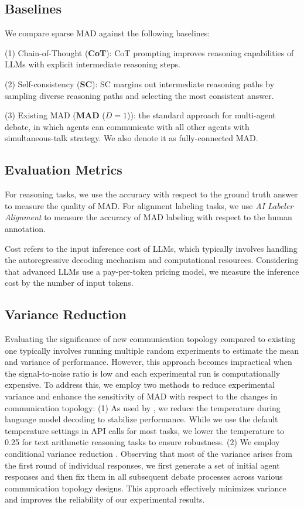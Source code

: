 \documentclass[11pt]{article}
\begin{document}
\subsection{Baselines}
We compare sparse MAD against the following baselines:

(1) \noindent Chain-of-Thought (\textbf{CoT}): CoT prompting improves reasoning capabilities of LLMs with explicit intermediate reasoning steps.

(2) \noindent Self-consistency (\textbf{SC}): SC margins out intermediate reasoning paths by sampling diverse reasoning paths and selecting the most consistent answer.

(3) \noindent Existing MAD (\textbf{MAD} ($D=1$)): the standard approach for multi-agent debate, in which agents can communicate with all other agents with simultaneous-talk strategy. We also denote it as fully-connected MAD.


\subsection{Evaluation Metrics}
For reasoning tasks, we use the accuracy with respect to the ground truth answer to measure the quality of MAD. For alignment labeling tasks, we use \textit{AI Labeler Alignment} \cite{lee2023rlaif} to measure the accuracy of MAD labeling with respect to the human annotation.

Cost refers to the input inference cost of LLMs, which typically involves handling the autoregressive decoding mechanism and computational resources. Considering that advanced LLMs use a pay-per-token pricing model, we measure the inference cost by the number of input tokens.

\subsection{Variance Reduction}
Evaluating the significance of new communication topology compared to existing one typically involves running multiple random experiments to estimate the mean and variance of performance. However, this approach becomes impractical when the signal-to-noise ratio is low and each experimental run is computationally expensive. To address this, we employ two methods to reduce experimental variance and enhance the sensitivity of MAD with respect to the changes in communication topology: (1) As used by \citet{wang2024rethinking}, we reduce the temperature during language model decoding to stabilize performance. While we use the default temperature settings in API calls for most tasks, we lower the temperature to 0.25 for text arithmetic reasoning tasks to ensure robustness. (2) We employ conditional variance reduction \cite{ross2002simulation}. Observing that most of the variance arises from the first round of individual responses, we first generate a set of initial agent responses and then fix them in all subsequent debate processes across various communication topology designs. This approach effectively minimizes variance and improves the reliability of our experimental results.
\end{document}
